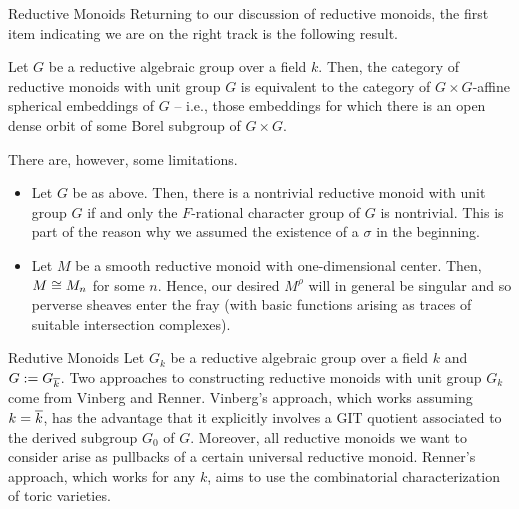 \documentclass[aspectratio=1610]{beamer}
\begin{document}
\begin{frame}{Reductive Monoids}
Returning to our discussion of reductive monoids, the first item indicating we are on the right track is the following result.

\begin{theorem}[Rittatore]
\pause Let $G$ be a reductive algebraic group over a field $k$. Then, the category of reductive monoids with unit group $G$ is equivalent to the category of $G\times G$-affine spherical embeddings of $G$ -- i.e., those embeddings for which there is an open dense orbit of some Borel subgroup of $G\times G$.
\end{theorem}

\pause There are, however, some limitations.
\begin{itemize}
\pause\item Let $G$ be as above. Then, there is a nontrivial reductive monoid with unit group $G$ if and only the $F$-rational character group of $G$ is nontrivial. This is part of the reason why we assumed the existence of a $\sigma$ in the beginning.

\pause\item Let $M$ be a smooth reductive monoid with one-dimensional center. Then, $M\cong M_n$ for some $n$. Hence, our desired $M^{\rho}$ will in general be singular and so perverse sheaves enter the fray (with basic functions arising as traces of suitable intersection complexes).
\end{itemize}
\end{frame}

\begin{frame}{Redutive Monoids}
Let $G_k$ be a reductive algebraic group over a field $k$ and $G:=G_{\overline{k}}$. \pause Two approaches to constructing reductive monoids with unit group $G_k$ come from Vinberg and Renner. \pause Vinberg's approach, which works assuming $k=\overline{k}$, has the advantage that it explicitly involves a GIT quotient associated to the derived subgroup $G_0$ of $G$. Moreover, all reductive monoids we want to consider arise as pullbacks of a certain universal reductive monoid. \pause Renner's approach, which works for any $k$, aims to use the combinatorial characterization of toric varieties.
\end{frame}
\end{document}

